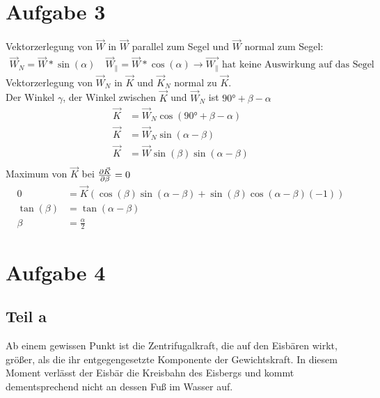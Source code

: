 \documentclass[a4paper,10pt]{extarticle}
\begin{document}
  \section*{Aufgabe 3}
  Vektorzerlegung von $\vec{W}$ in $\vec{W}$ parallel zum Segel und $\vec{W}$ normal zum Segel:
  \begin{align*}
  \vec{W}_N = \vec{W}*\sin(\alpha) \quad \vec{W}_\parallel = \vec{W}*\cos(\alpha) \rightarrow \vec{W_\parallel} \mbox{ hat keine Auswirkung auf das Segel}
  \end{align*}
  Vektorzerlegung von $\vec{W}_N$ in $\vec{K}$ und $\vec{K}_N$ normal zu $\vec{K}$. \\
  Der Winkel $\gamma$, der Winkel zwischen $\vec{K}$ und $\vec{W}_N$ ist $\ang{90}+ \beta - \alpha$ \\
  \begin{align*}
  \vec{K}&=\vec{W}_N \cos({\ang{90} + \beta - \alpha}) \\
  \vec{K}&=\vec{W}_N \sin(\alpha - \beta) \\
  \vec{K}&=\vec{W} \sin(\beta) \sin(\alpha - \beta) \\
  \end{align*} 
  Maximum von $\vec{K}$ bei $\pdv{\vec{K}}{\beta}=0$
  \begin{align*}
  0 &= \vec{K}(\cos(\beta)\sin(\alpha - \beta) + \sin(\beta)\cos(\alpha - \beta)(-1)) \\
  \tan(\beta) &= \tan(\alpha - \beta) \\
  \beta &= \frac{\alpha}{2}
  \end{align*}

  \section*{Aufgabe 4}
  \subsection*{Teil a}
  Ab einem gewissen Punkt ist die Zentrifugalkraft, die auf den Eisbären wirkt, größer, als die ihr entgegengesetzte Komponente der Gewichtskraft. In diesem Moment verlässt der Eisbär die Kreisbahn des Eisbergs und kommt dementsprechend nicht an dessen Fuß im Wasser auf.  
\end{document}
